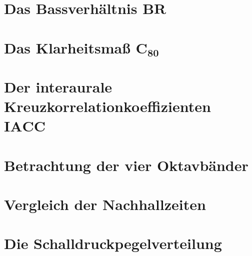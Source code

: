 \section{Das Bassverhältnis $\mathbf{BR}$}
\label{sec:br}


\section{Das Klarheitsmaß $\mathbf{C_{80}}$}
\label{sec:c80}


\section{Der interaurale Kreuzkorrelationkoeffizienten $\mathbf{IACC}$}
\label{sec:iacc}


\section{Betrachtung der vier Oktavbänder}
\label{sec:bands}


\section{Vergleich der Nachhallzeiten}
\label{sec:ts}


\section{Die Schalldruckpegelverteilung}
\label{sec:sdpv}